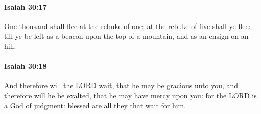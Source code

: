 		\paragraph{Isaiah 30:17} %
			\label{ISAIAH-30-17}

			One thousand shall flee at the rebuke of one; at the rebuke of five shall ye flee: till ye be left as a beacon upon the top of a mountain, and as an ensign on an hill.


		\paragraph{Isaiah 30:18} %
			\label{ISAIAH-30-18}

			And therefore will the LORD wait, that he may be gracious unto you, and therefore will he be exalted, that he may have mercy upon you: for the LORD is a God of judgment: blessed are all they that wait for him.

